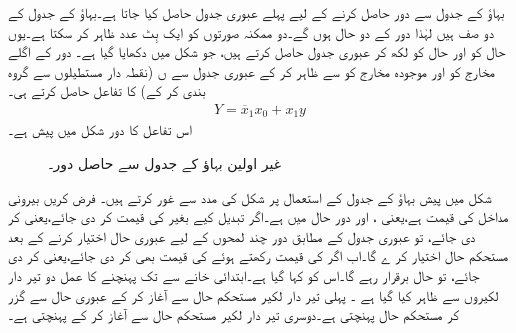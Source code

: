  بہاؤ کے جدول سے دور حاصل کرنے کے لیے پہلے عبوری جدول حاصل کیا جاتا ہے۔بہاؤ کے جدول کے دو صف ہیں لہٰذا دور کے دو حال ہوں گے۔دو ممکنہ صورتوں کو ایک بِٹ عدد ظاہر کر سکتا ہے۔یوں حال  کو  اور حال  کو  لکھ کر عبوری جدول حاصل کرتے ہیں، جو شکل  میں دکھایا گیا ہے۔ دور کے اگلے مخارج کو  اور موجودہ مخارج کو  سے ظاہر کر کے عبوری جدول سے ں (نقطہ دار مستطیلوں سے گروہ بندی کر کے)   کا تفاعل حاصل کرتے ہی۔
\begin{align}
Y=\overline{x}_1x_0+x_1y
\end{align}
اس تفاعل کا دور شکل  میں  پیش  ہے۔

\begin{figure}
\centering
{}
\caption{غیر اولین بہاؤ کے جدول سے حاصل دور۔}
\label{شکل_غیر_معاصر_غیر_اولین_سے_دور}
\end{figure}

 شکل   میں پیش بہاؤ کے جدول کے استعمال پر شکل    کی مدد سے غور کرتے ہیں۔ فرض کریں بیرونی مداخل  کی قیمت  ہے،یعنی  ، اور دور حال  میں ہے۔اگر  تبدیل کیے بغیر  کی قیمت  کر دی جائے،یعنی  کر دی جائے، تو عبوری جدول کے مطابق دور چند لمحوں کے لیے عبوری حال  اختیار کرنے کے بعد مستحکم حال  اختیار کر ے گا۔اب اگر  کی قیمت  رکھتے ہوئے  کی قیمت بھی  کر دی جائے،یعنی  کر دی جائے، تو حال  برقرار رہے گا۔اس  کو کہا گیا ہے۔ابتدائی خانے سے تک پہنچنے کا عمل    دو تیر دار لکیروں  سے ظاہر کیا گیا ہے ۔ پہلی  تیر دار لکیر مستحکم حال  سے  آغاز کر کے  عبوری حال   سے گزر کر  مستحکم حال   پہنچتی ہے۔دوسری تیر دار لکیر  مستحکم حال  سے آغاز کر کے   پہنچتی ہے۔

